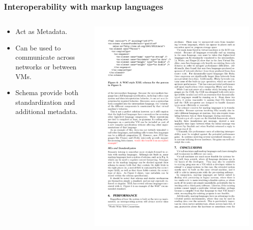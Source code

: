\documentclass{beamer}
\begin{document}
 \begin{frame}
  \frametitle{Interoperability with markup languages}
  \begin{columns}
  \begin{column}{0.5\textwidth}
  \begin{itemize}
  \item Act as Metadata.
  \item Can be used to communicate across networks or between VMs.
  \item Schema provide both standardization and additional metadata.
  \end{itemize}
  \end{column}
  
  \begin{column}{0.66\textwidth}  
  \includegraphics[scale=0.8]{graphics/XMLSchemaW3C.pdf}
  \end{column}
  \end{columns}
 \end{frame}
\end{document}
